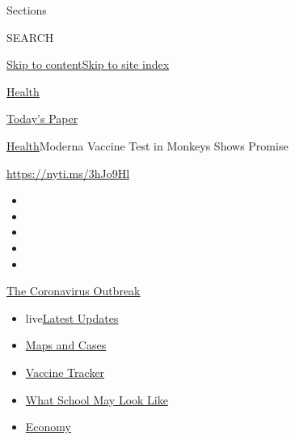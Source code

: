 Sections

SEARCH

\protect\hyperlink{site-content}{Skip to
content}\protect\hyperlink{site-index}{Skip to site index}

\href{https://www.nytimes.com/section/health}{Health}

\href{https://myaccount.nytimes.com/auth/login?response_type=cookie\&client_id=vi}{}

\href{https://www.nytimes.com/section/todayspaper}{Today's Paper}

\href{/section/health}{Health}\textbar{}Moderna Vaccine Test in Monkeys
Shows Promise

\url{https://nyti.ms/3hJo9Hl}

\begin{itemize}
\item
\item
\item
\item
\item
\end{itemize}

\href{https://www.nytimes.com/news-event/coronavirus?action=click\&pgtype=Article\&state=default\&region=TOP_BANNER\&context=storylines_menu}{The
Coronavirus Outbreak}

\begin{itemize}
\tightlist
\item
  live\href{https://www.nytimes.com/2020/08/02/world/coronavirus-updates.html?action=click\&pgtype=Article\&state=default\&region=TOP_BANNER\&context=storylines_menu}{Latest
  Updates}
\item
  \href{https://www.nytimes.com/interactive/2020/us/coronavirus-us-cases.html?action=click\&pgtype=Article\&state=default\&region=TOP_BANNER\&context=storylines_menu}{Maps
  and Cases}
\item
  \href{https://www.nytimes.com/interactive/2020/science/coronavirus-vaccine-tracker.html?action=click\&pgtype=Article\&state=default\&region=TOP_BANNER\&context=storylines_menu}{Vaccine
  Tracker}
\item
  \href{https://www.nytimes.com/interactive/2020/07/29/us/schools-reopening-coronavirus.html?action=click\&pgtype=Article\&state=default\&region=TOP_BANNER\&context=storylines_menu}{What
  School May Look Like}
\item
  \href{https://www.nytimes.com/live/2020/07/31/business/stock-market-today-coronavirus?action=click\&pgtype=Article\&state=default\&region=TOP_BANNER\&context=storylines_menu}{Economy}
\end{itemize}

